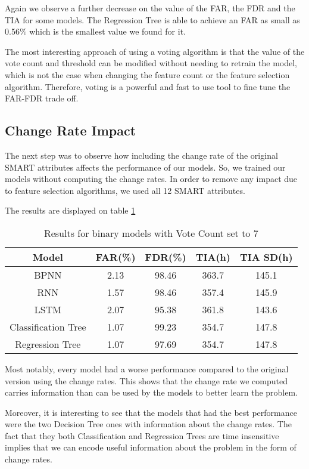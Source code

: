 Again we observe a further decrease on the value of the FAR, the FDR and the TIA for some models.
The Regression Tree is able to achieve an FAR as small as 0.56\% which is the smallest value we found for it.

The most interesting approach of using a voting algorithm is that the value of the vote count and threshold can be modified without needing to retrain the model, which is not the case when changing the feature count or the feature selection algorithm.
Therefore, voting is a powerful and fast to use tool to fine tune the FAR-FDR trade off.

\subsection{Change Rate Impact}\label{subsec:change_rate_impact}

The next step was to observe how including the change rate of the original SMART attributes affects the performance of our models.
So, we trained our models without computing the change rates.
In order to remove any impact due to feature selection algorithms, we used all 12 SMART attributes.

The results are displayed on table \ref{table:results_binary_no_change_rate}

\begin{table}
  \begin{center}
    \begin{tabular}{|c|c|c|c|c|}
      \hline
    Model & FAR(\%) & FDR(\%) & TIA(h) & TIA SD(h) \\
    \hline
    BPNN & 2.13 & 98.46 & 363.7 & 145.1 \\
    RNN & 1.57 & 98.46 & 357.4 & 145.9 \\
    LSTM & 2.07 & 95.38 & 361.8 & 143.6 \\
    Classification Tree & 1.07 & 99.23 & 354.7 & 147.8 \\
    Regression Tree & 1.07 & 97.69 & 354.7 & 147.8 \\
    \hline
    \end{tabular}
    \caption[Results Binary Models with Voting]{Results for binary models with Vote Count set to 7}
    \label{table:results_binary_no_change_rate}
  \end{center}
\end{table}

Most notably, every model had a worse performance compared to the original version using the change rates.
This shows that the change rate we computed carries information than can be used by the models to better learn the problem.

Moreover, it is interesting to see that the models that had the best performance were the two Decision Tree ones with information about the change rates.
The fact that they both Classification and Regression Trees are time insensitive implies that we can encode useful information about the problem in the form of change rates. 